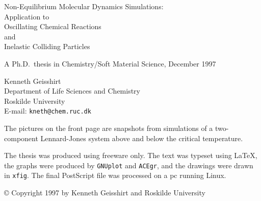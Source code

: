 
\thispagestyle{empty}
\begin{center}
  {\Huge Non-Equilibrium Molecular Dynamics Simulations: \\ Application to \\
Oscillating Chemical Reactions \\ and \vspace{0.15cm} \\ Inelastic Colliding Particles}
\end{center}

\vspace{0.25cm}
\begin{center}
  {\large A Ph.D.\ thesis in Chemistry/Soft Material Science, December 1997}
\end{center}

\vfill

\begin{minipage}[b]{0.46\linewidth}
  \centering{}
\end{minipage}\hfill
\begin{minipage}[b]{0.46\linewidth}
  \centering{}
\end{minipage}

\vfill

\begin{minipage}[c]{3cm}
\end{minipage}\hfill
\begin{minipage}[c]{10cm}
  Kenneth Geisshirt \\
  Department of Life Sciences and Chemistry \\
  Roskilde University \\
  E-mail: \texttt{kneth@chem.ruc.dk}
\end{minipage}


\newpage
\thispagestyle{empty}
The pictures on the front page are snapshots from simulations of a
two-component Lennard-Jones system above and below the critical
temperature.

\vspace{1cm}
The thesis was produced using freeware only. The text was typeset using
\LaTeX, the graphs were produced by \texttt{GNUplot} and \texttt{ACEgr},
and the drawings were drawn in \texttt{xfig}. The final PostScript file
was processed on a pc running Linux.

\vfill
\copyright{} Copyright 1997 by Kenneth Geisshirt and Roskilde University
\newpage
\thispagestyle{empty}
